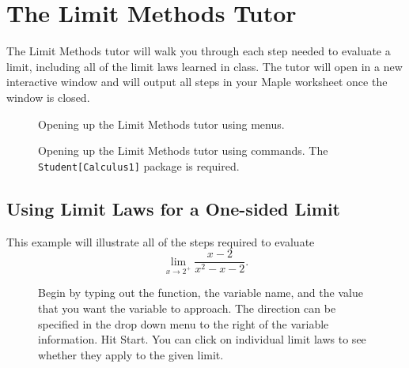\section{The Limit Methods Tutor}
\label{sec:limitmethodstutor}

The Limit Methods tutor will walk you through each step needed to evaluate a limit, including all of the limit laws learned in class. The tutor will open in a new interactive window and will output all steps in your Maple worksheet once the window is closed.

\begin{figure}[h]
\caption{Opening up the Limit Methods tutor using menus.}
\centering
{}
\end{figure}

\begin{figure}[h]
\caption{Opening up the Limit Methods tutor using commands. The \texttt{Student[Calculus1]} package is required.}
\centering
{}
\end{figure}

\newpage

\subsection{Using Limit Laws for a One-sided Limit}
This example will illustrate all of the steps required to evaluate \[ \displaystyle\lim_{x \rightarrow 2^+} \frac{x-2}{x^2-x-2}. \]
\begin{figure}[h]
\caption{Begin by typing out the function, the variable name, and the value that you want the variable to approach. The direction can be specified in the drop down menu to the right of the variable information. Hit Start. You can click on individual limit laws to see whether they apply to the given limit.}
\centering
{}
\vspace{-1cm}
\end{figure}

